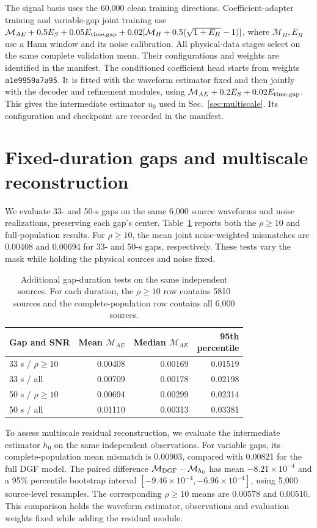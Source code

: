 \documentclass[10pt,prd,aps,a4paper,twocolumn,superscriptaddress,nofootinbib,floatfix]{revtex4-2}
\begin{document}
The signal basis uses the 60,000 clean training directions. Coefficient-adapter training and variable-gap joint training use $\mathcal M_{AE}+0.5E_S+0.05E_{\rm time,gap}+0.02[\mathcal M_H+0.5(\sqrt{1+E_H}-1)]$, where $\mathcal M_H,E_H$ use a Hann window and its noise calibration. All physical-data stages select on the same complete validation mean. Their configurations and weights are identified in the manifest. The conditioned coefficient head starts from weights \texttt{a1e9959a7a95}. It is fitted with the waveform estimator fixed and then jointly with the decoder and refinement modules, using $\mathcal M_{AE}+0.2E_S+0.02E_{\rm time,gap}$. This gives the intermediate estimator $u_0$ used in Sec.~\ref{sec:multiscale}. Its configuration and checkpoint are recorded in the manifest.

\section{Fixed-duration gaps and multiscale reconstruction}\label{app:fixed_gaps}
We evaluate 33- and 50-s gaps on the same 6,000 source waveforms and noise realizations, preserving each gap's center. Table~\ref{tab:fixed_gaps} reports both the $\rho\ge10$ and full-population results. For $\rho\ge10$, the mean joint noise-weighted mismatches are 0.00408 and 0.00694 for 33- and 50-s gaps, respectively. These tests vary the mask while holding the physical sources and noise fixed.
\begin{table}[t]\centering\setlength{\tabcolsep}{2pt}
\caption{Additional gap-duration tests on the same independent sources. For each duration, the $\rho\ge10$ row contains 5810 sources and the complete-population row contains all 6,000 sources.}\label{tab:fixed_gaps}
\begin{tabular}{lrrr}\hline\hline
Gap and SNR & Mean $\mathcal M_{AE}$ & Median $\mathcal M_{AE}$ & \shortstack{95th\\percentile}\\\hline
33 s / $\rho\ge10$ & 0.00408 & 0.00169 & 0.01519\\
33 s / all & 0.00709 & 0.00178 & 0.02198\\
50 s / $\rho\ge10$ & 0.00694 & 0.00299 & 0.02314\\
50 s / all & 0.01110 & 0.00313 & 0.03381\\
\hline\hline\end{tabular}\end{table}

To assess multiscale residual reconstruction, we evaluate the intermediate estimator $h_0$ on the same independent observations. For variable gaps, its complete-population mean mismatch is 0.00903, compared with 0.00821 for the full DGF model. The paired difference $\mathcal M_{\rm DGF}-\mathcal M_{h_0}$ has mean $-8.21\times10^{-4}$ and a 95\% percentile bootstrap interval $[-9.46\times10^{-4},-6.96\times10^{-4}]$, using 5,000 source-level resamples. The corresponding $\rho\ge10$ means are 0.00578 and 0.00510. This comparison holds the waveform estimator, observations and evaluation weights fixed while adding the residual module.
\end{document}
